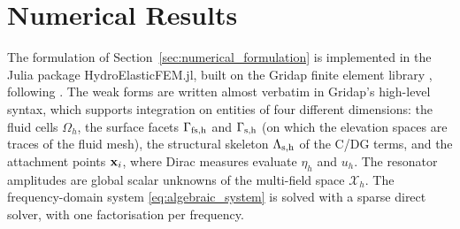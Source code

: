 \section{Numerical Results}\label{sec:numerical_results}

The formulation of Section~\ref{sec:numerical_formulation} is implemented in the Julia package HydroElasticFEM.jl, built on the Gridap finite element library \cite{badia2020gridap,verdugo2022software}, following \cite{colomes2023monolithic,agarwal2024dynamic}. The weak forms are written almost verbatim in Gridap's high-level syntax, which supports integration on entities of four different dimensions: the fluid cells $\Omega_h$, the surface facets $\Gamma_{\mbox{\scriptsize fs,h}}$ and $\Gamma_{\mbox{\scriptsize s,h}}$ (on which the elevation spaces are traces of the fluid mesh), the structural skeleton $\Lambda_{\mbox{\scriptsize s,h}}$ of the C/DG terms, and the attachment points $\mathbf{x}_i$, where Dirac measures evaluate $\eta_h$ and $u_h$. The resonator amplitudes are global scalar unknowns of the multi-field space $\mathcal{X}_h$. The frequency-domain system \eqref{eq:algebraic_system} is solved with a sparse direct solver, with one factorisation per frequency.

